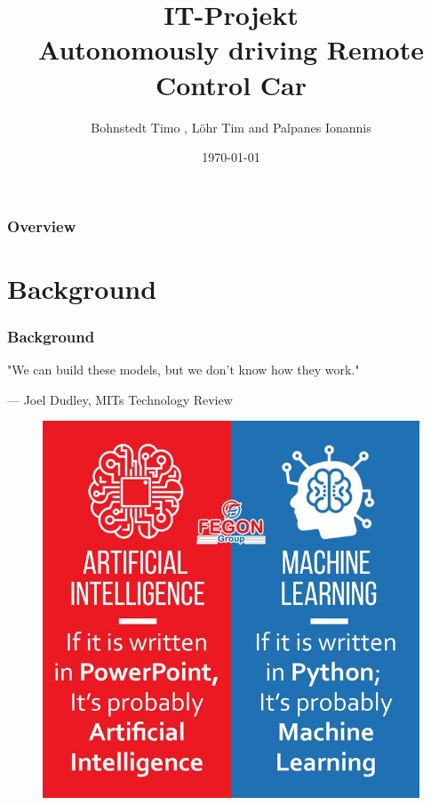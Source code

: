 \documentclass{beamer}
\title{IT-Projekt \\ Autonomously driving Remote Control Car} %
\author{Bohnstedt Timo ,
      L\"ohr Tim and Palpanes Ionannis\\%
      }
\institute[Computer Science| Prof. Dr. Florian Gallwitz] %
{
Georg Simon Ohm University of Applied Science\\ %
\medskip
\textit{IT Project Presentation} 
}
\date{\today} %
\begin{document}
\begin{frame}
\titlepage %
\end{frame}
\begin{frame}
\frametitle{Overview} %
\tableofcontents %
\end{frame}
%

\section{Background}

\begin{frame}
\frametitle{Background}
\epigraph{"We can build these models, but we don't know how they work."}{--- \textup{ Joel Dudley}, MITs Technology Review}
\begin{figure}
\includegraphics[width=0.4\linewidth]{photo/aivsml}
\end{figure}
\end{frame}

\end{document}
